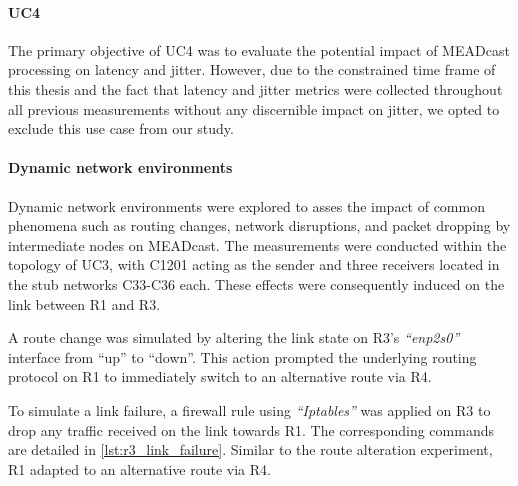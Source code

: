 \paragraph{UC4} %
\label{par:UC4}
The primary objective of UC4 was to evaluate the potential impact of MEADcast
    processing on latency and jitter.
However, due to the constrained time frame of this thesis and the fact that 
    latency and jitter metrics were collected throughout all previous
    measurements without any discernible impact on jitter, we opted to exclude
    this use case from our study.

\paragraph{Dynamic network environments} %
\label{par:Dynamic network environments}
Dynamic network environments were explored to asses the impact of common
    phenomena such as routing changes, network disruptions, and packet dropping
    by intermediate nodes on MEADcast.
The measurements were conducted within the topology of UC3, with C1201 acting
    as the sender and three receivers located in the stub networks C33-C36
    each.
These effects were consequently induced on the link between R1 and R3.

A route change was simulated by altering the link state on R3's
    \textit{``enp2s0''} interface from ``up'' to ``down''.
This action prompted the underlying routing protocol on R1 to immediately
    switch to an alternative route via R4.

To simulate a link failure, a firewall rule using \textit{``Iptables''} was
    applied on R3 to drop any traffic received on the link towards R1.
The corresponding commands are detailed in \autoref{lst:r3_link_failure}.
Similar to the route alteration experiment, R1 adapted to an alternative route
    via R4.

